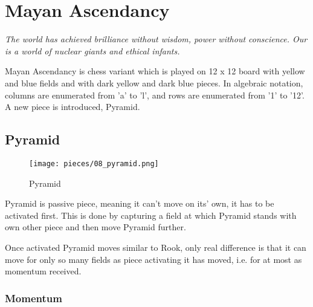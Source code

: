 
\chapter*{Mayan Ascendancy}

\begin{flushright}
\parbox{0.8\textwidth}{
\emph{The world has achieved brilliance without wisdom, power without
conscience. Our is a world of nuclear giants and ethical infants. \\
 } }
\end{flushright}

\noindent
Mayan Ascendancy is chess variant which is played on 12 x 12 board with
yellow and blue fields and with dark yellow and dark blue pieces. In
algebraic notation, columns are enumerated from 'a' to 'l', and rows are
enumerated from '1' to '12'. A new piece is introduced, Pyramid.

\clearpage %

\section*{Pyramid}

\noindent
\begin{wrapfigure}[12]{l}{0.4\textwidth}
\centering
\texttt{[image: pieces/08\_pyramid.png]}
\caption{Pyramid}
\label{fig:08_pyramid}
\end{wrapfigure}
Pyramid is passive piece, meaning it can't move on its' own, it has to be
activated first. This is done by capturing a field at which Pyramid stands
with own other piece and then move Pyramid further.

Once activated Pyramid moves similar to Rook, only real difference is that
it can move for only so many fields as piece activating it has moved, i.e.
for at most as momentum received.

\subsection*{Momentum}

